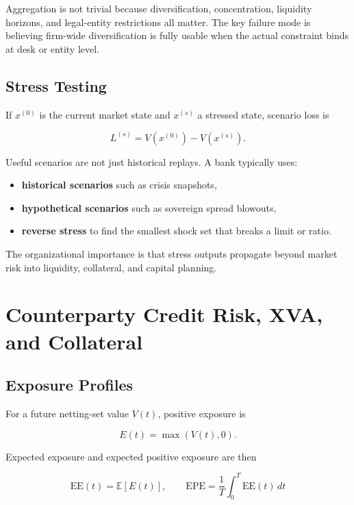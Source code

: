 \documentclass{apex_mdd}
\begin{document}
Aggregation is not trivial because diversification, concentration, liquidity horizons, and legal-entity restrictions all matter. The key failure mode is believing firm-wide diversification is fully usable when the actual constraint binds at desk or entity level.

\subsection{Stress Testing}

If $x^{(0)}$ is the current market state and $x^{(s)}$ a stressed state, scenario loss is
\begin{formulabox}
\[
  L^{(s)} = V(x^{(0)}) - V(x^{(s)}).
\]
\end{formulabox}

Useful scenarios are not just historical replays. A bank typically uses:
\begin{itemize}
  \item \textbf{historical scenarios} such as crisis snapshots,
  \item \textbf{hypothetical scenarios} such as sovereign spread blowouts,
  \item \textbf{reverse stress} to find the smallest shock set that breaks a limit or ratio.
\end{itemize}

The organizational importance is that stress outputs propagate beyond market risk into liquidity, collateral, and capital planning.

\section{Counterparty Credit Risk, XVA, and Collateral}

\subsection{Exposure Profiles}

For a future netting-set value $V(t)$, positive exposure is
\begin{formulabox}
\[
  E(t) = \max(V(t),0).
\]
\end{formulabox}

Expected exposure and expected positive exposure are then
\begin{formulabox}
\[
  \mathrm{EE}(t) = \mathbb{E}[E(t)],
  \qquad
  \mathrm{EPE} = \frac{1}{T}\int_0^T \mathrm{EE}(t)\,dt
\]
\end{formulabox}
\end{document}
